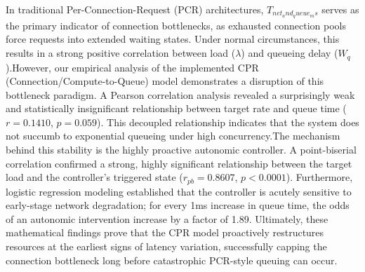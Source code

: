\documentclass{article}
\begin{document}
\begin{itemize}
In traditional Per-Connection-Request (PCR) architectures, $T_{net_and_queue_ms}$ serves as the primary indicator of connection bottlenecks, as exhausted connection pools force requests into extended waiting states. Under normal circumstances, this results in a strong positive correlation between load ($\lambda$) and queueing delay ($W_q$).However, our empirical analysis of the implemented CPR (Connection/Compute-to-Queue) model demonstrates a disruption of this bottleneck paradigm. A Pearson correlation analysis revealed a surprisingly weak and statistically insignificant relationship between target rate and queue time ($r = 0.1410$, $p = 0.059$). This decoupled relationship indicates that the system does not succumb to exponential queueing under high concurrency.The mechanism behind this stability is the highly proactive autonomic controller. A point-biserial correlation confirmed a strong, highly significant relationship between the target load and the controller's triggered state ($r_{pb} = 0.8607$, $p < 0.0001$). Furthermore, logistic regression modeling established that the controller is acutely sensitive to early-stage network degradation; for every 1ms increase in queue time, the odds of an autonomic intervention increase by a factor of 1.89. Ultimately, these mathematical findings prove that the CPR model proactively restructures resources at the earliest signs of latency variation, successfully capping the connection bottleneck long before catastrophic PCR-style queuing can occur.

\end{itemize}
\end{document}
